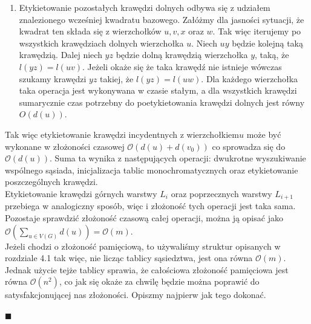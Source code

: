 \documentclass[12pt,a4paper,titlepage]{article}
\newcommand\tab[1][1cm]{\hspace*{#1}}
\begin{document}
\begin{enumerate}
\begin{enumerate}[a)]
\end{enumerate} 
\item
Etykietowanie pozostałych krawędzi dolnych odbywa się z udziałem znalezionego wcześniej kwadratu bazowego. Załóżmy dla jasności sytuacji, że kwadrat ten składa się z wierzchołków $u,v,x$ oraz $w$. Tak więc iterujemy po wszystkich krawędziach dolnych wierzchołka $u$. Niech $uy$ będzie kolejną taką krawędzią. Dalej niech $yz$ będzie dolną krawędzią wierzchołka $y$, taką, że $l(yz)=l(uv)$. Jeżeli okaże się że taka krawędź nie istnieje wówczas szukamy krawędzi $yz$ takiej, że $l(yz)=l(uw)$. Dla każdego wierzchołka taka operacja jest wykonywana w czasie stałym, a dla wszystkich krawędzi sumarycznie czas potrzebny do poetykietowania krawędzi dolnych jest równy $O(d(u))$. \\
\end{enumerate}
\tab[0.6cm]Tak więc etykietowanie krawędzi incydentnych z wierzchołkiem$u$ może być wykonane w złożoności czasowej $\mathcal{O}(d(u) + d(v_0))$ co sprowadza się do $\mathcal{O}(d(u)) $. Suma ta wynika z następujących operacji: dwukrotne wyszukiwanie wspólnego sąsiada, inicjalizacja tablic monochromatycznych oraz etykietowanie poszczególnych krawędzi.\\
\tab[0.6cm]Etykietowanie krawędzi górnych warstwy $L_i$ oraz poprzecznych warstwy $L_{i+1}$ przebiega w analogiczny sposób, więc i złożoność tych operacji jest taka sama.\\
\tab[0.6cm]Pozostaje sprawdzić złożoność czasową całej operacji, można ją opisać jako \\
$\mathcal{O}(\sum _{u \in V(G)} d(u)) = \mathcal{O}(m)$.\\
\tab[0.6cm]Jeżeli chodzi o złożoność pamięciową, to używaliśmy struktur opisanych w rozdziale 4.1 tak więc, nie licząc tablicy sąsiedztwa, jest ona równa $\mathcal{O}(m)$. Jednak użycie tejże tablicy sprawia, że całościowa złożoność pamięciowa jest równa $\mathcal{O}(n^2)$, co jak się okaże za chwilę będzie można poprawić do satysfakcjonującej nas złożoności. Opiszmy najpierw jak tego dokonać.
\begin{flushright}
$\blacksquare$
\end{flushright}
\end{document}

